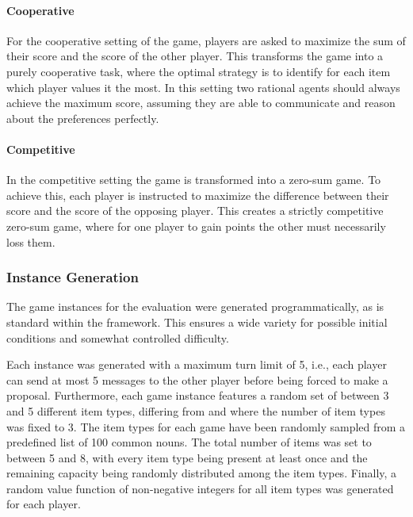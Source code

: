 \paragraph{Cooperative}
For the cooperative setting of the game, players are asked to maximize the sum of their score and the score of the other player. This transforms the game into a purely cooperative task, where the optimal strategy is to identify for each item which player values it the most. In this setting two rational agents should always achieve the maximum score, assuming they are able to communicate and reason about the preferences perfectly.

\paragraph{Competitive}
In the competitive setting the game is transformed into a zero-sum game. To achieve this, each player is instructed to maximize the difference between their score and the score of the opposing player. This creates a strictly competitive zero-sum game, where for one player to gain points the other must necessarily loss them.


\subsubsection{Instance Generation}

The game instances for the evaluation were generated programmatically, as is standard within the  framework. This ensures a wide variety for possible initial conditions and somewhat controlled difficulty.

Each instance was generated with a maximum turn limit of 5, i.e., each player can send at most 5 messages to the other player before being forced to make a proposal. Furthermore, each game instance features a random set of between 3 and 5 different item types, differing from \cite{liao2024efficacy} and \cite{lewis2017deal} where the number of item types was fixed to 3. The item types for each game have been randomly sampled from a predefined list of 100 common nouns. The total number of items was set to between 5 and 8, with every item type being present at least once and the remaining capacity being randomly distributed among the item types. Finally, a random value function of non-negative integers for all item types was generated for each player.

